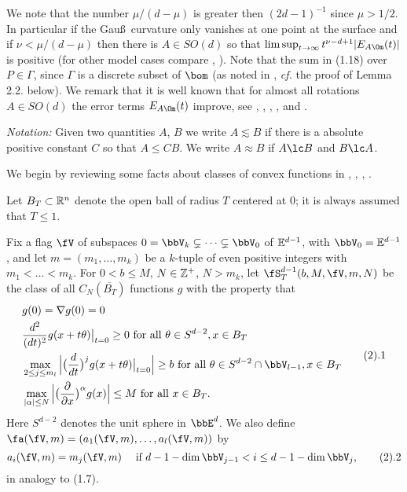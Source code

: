 We note that 
the number $\mu/(d-\mu)$ is greater then
$(2d-1)^{-1}$ since $\mu>1/2$.
In  particular if the Gau\ss \ curvature only vanishes 
at one point at the surface and if 
$\nu<\mu/(d-\mu)$ then 
there is  $A\in SO(d)$ 
so that
$\limsup_{t\to \infty} t^{\nu-d+1} |E_{A \Om}(t) |$
is  positive (for other model cases  compare \cite{19}, \cite{23}). 
Note that the sum in (1.18) over $P\in \Gamma$, since $\Gamma$ is a discrete subset of 
$\bom$ (as noted in \cite{16}, {\it cf.} the proof of Lemma 2.2. below).
We remark that it is well known that for almost all rotations $A\in SO(d)$ the error terms 
$E_{A\Om}(t)$ improve, see
  \cite{5}, \cite{31},
\cite{32},
\cite{23}, \cite{15} and \cite{2}.



{\it Notation:} 
Given two quantities $A$, $B$ we write $A\lesssim B$ if there is a absolute positive constant
$C$ so that $A\le C B$.
We write $A\approx B$ if $A\lc B$ and $B\lc A$.




\endhead

We begin by reviewing  some facts about classes of convex functions in 
\cite{3}, \cite{26}, \cite{16}, \cite{17}.

Let    $B_{T}\subset \Bbb R^{n}$  denote the open ball  
of radius $T$ centered at $0$;
it is always assumed that 
$T\le 1$.

Fix a flag $\fV$ 
 of subspaces $0=\bbV_k\subsetneq \dots\subsetneq \bbV_0$
 of $\Bbb E^{d-1}$, with
$\bbV_0=\Bbb E^{d-1}$,
and let 
$m=(m_1,\dots,m_k)$ be a $k$-tuple of even positive integers with
$m_1<\dots<m_k$.
For $0<b\le M$,  $N\in\Bbb Z^+$, $N>m_k$,  let
 $\fS_T^{d-1}(b,M,\fV, m,N)$ 
be the class of all $C_N(\overline{B_T})$ functions $g$
 with the property
that 
$$
\aligned
&g(0)=\nabla g(0)=0
\\
&\frac{d^2}{(dt)^2} g(x+t\theta)\big|_{t=0}\ge 0 \text{ for all }
\theta\in S^{d-2}, x\in B_T
\\
&\max_{2\le j\le m_l} \Big|\big(\frac {d}{dt}\big)^j g(x+t\theta)
\big|_{t=0}\Big|\ge 
b \text{ for all }
\theta\in S^{d-2}\cap \bbV_{l-1}, x\in B_T
\\
& \max_{|\alpha|\le N} \Big|\big(\frac{\partial}{\partial x}
\big)^\alpha g(x)\Big|\le M
\text{ for all } x\in B_T.
\endaligned
\tag 2.1
$$
Here $S^{d-2}$ denotes the unit sphere in $\bbE^{d}$.
We also define
$\fa(\fV,m)= (a_1(\fV,m),\dots, a_l(\fV,m))$ by
$$
a_i(\fV,m)=m_j(\fV,m) \quad \text{ if } d-1-\dim\bbV_{j-1}<i\le d-1-\dim\bbV_j,
\tag 2.2
$$
in analogy to (1.7).

